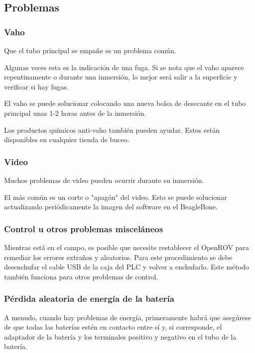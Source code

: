 \subsection{Problemas}
\label{subsec:problemas}
\subsubsection{Vaho}
\label{subsubsec:vaho}
Que el tubo principal se empañe es un problema común.

Algunas veces esta es la indicación de una fuga. Si se nota que el vaho aparece repentinamente o durante una inmersión, lo mejor será salir a la superficie y verificar si hay fugas.

El vaho se puede solucionar colocando una nueva bolsa de desecante en el tubo principal unas 1-2 horas antes de la inmersión.

Los productos químicos anti-vaho también pueden ayudar. Estos están disponibles en cualquier tienda de buceo.

\subsubsection{Video}
\label{subsubsec:video}
Muchos problemas de video pueden ocurrir durante su inmersión.

El más común es un corte o "apagón" del video. Esto se puede solucionar actualizando periódicamente la imagen del software en el BeagleBone.

\subsubsection{Control u otros problemas misceláneos}
\label{subsubsec:miscelaneos}
Mientras está en el campo, es posible que necesite restablecer el OpenROV para remediar los errores extraños y aleatorios. Para este procedimiento se debe desenchufar el cable USB de la caja del PLC y volver a enchufarlo. Este método también funciona para otros problemas de control.

\subsubsection{Pérdida aleatoria de energía de la batería}
\label{subsubsec:perdida_bateria}
A menudo, cuando hay problemas de energía, primeramente habrá que asegúrese de que todas las baterías estén en contacto entre sí y, si corresponde, el adaptador de la batería y los terminales positivo y negativo en el tubo de la batería.


